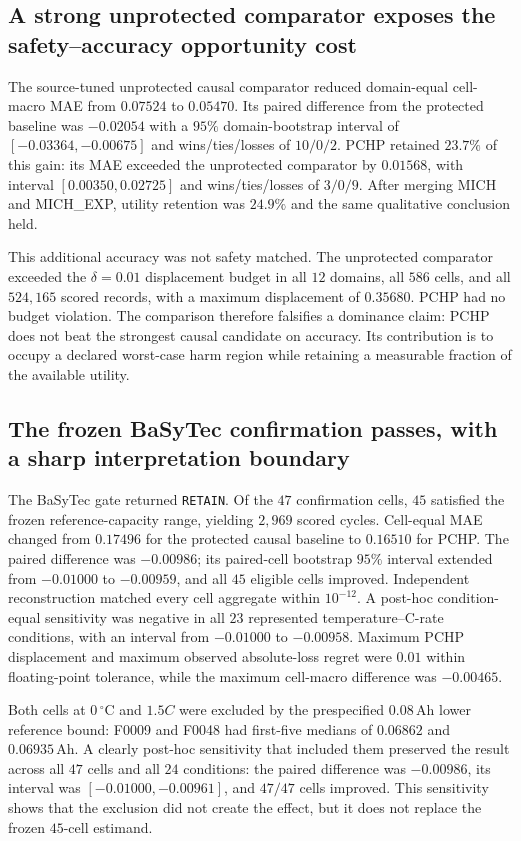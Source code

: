 \documentclass[11pt]{article}
\begin{document}
\subsection{A strong unprotected comparator exposes the safety--accuracy opportunity cost}

The source-tuned unprotected causal comparator reduced domain-equal cell-macro MAE from $0.07524$ to $0.05470$. Its paired difference from the protected baseline was $-0.02054$ with a $95\%$ domain-bootstrap interval of $[-0.03364,-0.00675]$ and wins/ties/losses of $10/0/2$. PCHP retained $23.7\%$ of this gain: its MAE exceeded the unprotected comparator by $0.01568$, with interval $[0.00350,0.02725]$ and wins/ties/losses of $3/0/9$. After merging MICH and MICH\_EXP, utility retention was $24.9\%$ and the same qualitative conclusion held.

This additional accuracy was not safety matched. The unprotected comparator exceeded the $\delta=0.01$ displacement budget in all $12$ domains, all $586$ cells, and all $524{,}165$ scored records, with a maximum displacement of $0.35680$. PCHP had no budget violation. The comparison therefore falsifies a dominance claim: PCHP does not beat the strongest causal candidate on accuracy. Its contribution is to occupy a declared worst-case harm region while retaining a measurable fraction of the available utility.

\subsection{The frozen BaSyTec confirmation passes, with a sharp interpretation boundary}

The BaSyTec gate returned \texttt{RETAIN}. Of the $47$ confirmation cells, $45$ satisfied the frozen reference-capacity range, yielding $2{,}969$ scored cycles. Cell-equal MAE changed from $0.17496$ for the protected causal baseline to $0.16510$ for PCHP. The paired difference was $-0.00986$; its paired-cell bootstrap $95\%$ interval extended from $-0.01000$ to $-0.00959$, and all $45$ eligible cells improved. Independent reconstruction matched every cell aggregate within $10^{-12}$. A post-hoc condition-equal sensitivity was negative in all $23$ represented temperature--C-rate conditions, with an interval from $-0.01000$ to $-0.00958$. Maximum PCHP displacement and maximum observed absolute-loss regret were $0.01$ within floating-point tolerance, while the maximum cell-macro difference was $-0.00465$.

Both cells at $0\,^{\circ}\mathrm{C}$ and $1.5C$ were excluded by the prespecified $0.08\,\mathrm{Ah}$ lower reference bound: F0009 and F0048 had first-five medians of $0.06862$ and $0.06935\,\mathrm{Ah}$. A clearly post-hoc sensitivity that included them preserved the result across all $47$ cells and all $24$ conditions: the paired difference was $-0.00986$, its interval was $[-0.01000,-0.00961]$, and $47/47$ cells improved. This sensitivity shows that the exclusion did not create the effect, but it does not replace the frozen $45$-cell estimand.
\end{document}
